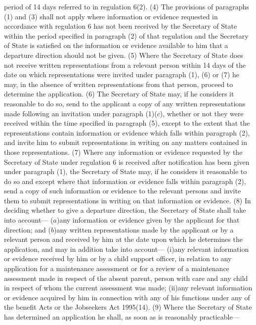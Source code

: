 \documentclass[a4paper]{article}
\begin{document}
period of 14 days referred to in regulation 6(2).
(4) The provisions of paragraphs (1) and (3) shall not apply where information
or evidence requested in accordance with regulation 6 has not been received by
the Secretary of State within the period specified in paragraph (2) of that
regulation and the Secretary of State is satisfied on the information or
evidence available to him that a departure direction should not be given.
(5) Where the Secretary of State does not receive written representations from a
relevant person within 14 days of the date on which representations were invited
under paragraph (1), (6) or (7) he may, in the absence of written
representations from that person, proceed to determine the application.
(6) The Secretary of State may, if he considers it reasonable to do so, send to
the applicant a copy of any written representations made following an invitation
under paragraph (1)($c$), whether or not they were received within the time
specified in paragraph (5), except to the extent that the representations
contain information or evidence which falls within paragraph (2), and invite him
to submit representations in writing on any matters contained in those
representations.
(7) Where any information or evidence requested by the Secretary of State under
regulation 6 is received after notification has been given under paragraph (1),
the Secretary of State may, if he considers it reasonable to do so and except
where that information or evidence falls within paragraph (2), send a copy of
such information or evidence to the relevant persons and invite them to submit
representations in writing on that information or evidence.
(8) In deciding whether to give a departure direction, the Secretary of State
shall take into account—
($a$)any information or evidence given by the applicant for that direction; and
($b$)any written representations made by the applicant or by a relevant person and
received by him at the date upon which he determines the application, and may in
addition take into account—
(i)any relevant information or evidence received by him or by a child support
officer, in relation to any application for a maintenance assessment or for a
review of a maintenance assessment made in respect of the absent parent, person
with care and any child in respect of whom the current assessment was made;
(ii)any relevant information or evidence acquired by him in connection with any
of his functions under any of the benefit Acts or the Jobseekers Act 1995(14).
(9) Where the Secretary of State has determined an application he shall, as soon
as is reasonably practicable—
\end{document}
